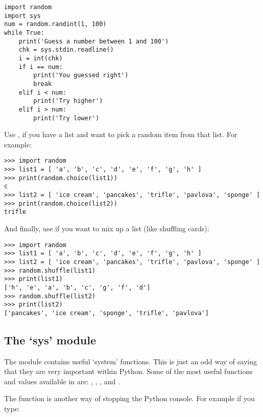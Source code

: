 \begin{listingignore}
\begin{verbatim}
import random
import sys
num = random.randint(1, 100)
while True:
    print('Guess a number between 1 and 100')
    chk = sys.stdin.readline()
    i = int(chk)
    if i == num:
        print('You guessed right')
        break
    elif i < num:
        print('Try higher')
    elif i > num:
        print('Try lower')
\end{verbatim}
\end{listingignore}

Use ,  if you have a list and want to pick a random item from that list. For example:

\begin{listingignore}
\begin{verbatim}
>>> import random
>>> list1 = [ 'a', 'b', 'c', 'd', 'e', 'f', 'g', 'h' ]
>>> print(random.choice(list1))
c
>>> list2 = [ 'ice cream', 'pancakes', 'trifle', 'pavlova', 'sponge' ]
>>> print(random.choice(list2))
trifle
\end{verbatim}
\end{listingignore}

And finally, use  if you want to mix up a list (like shuffling cards):

\begin{listingignore}
\begin{verbatim}
>>> import random
>>> list1 = [ 'a', 'b', 'c', 'd', 'e', 'f', 'g', 'h' ]
>>> list2 = [ 'ice cream', 'pancakes', 'trifle', 'pavlova', 'sponge' ]
>>> random.shuffle(list1)
>>> print(list1)
['h', 'e', 'a', 'b', 'c', 'g', 'f', 'd']
>>> random.shuffle(list2)
>>> print(list2)
['pancakes', 'ice cream', 'sponge', 'trifle', 'pavlova']
\end{verbatim}
\end{listingignore}

\subsection*{The `sys' module}

The  module contains useful `system' functions. This is just an odd way of saying that they are very important within Python. Some of the most useful functions and values available in  are: , , , and .
\par
The  function is another way of stopping the Python console. For example if you type:

